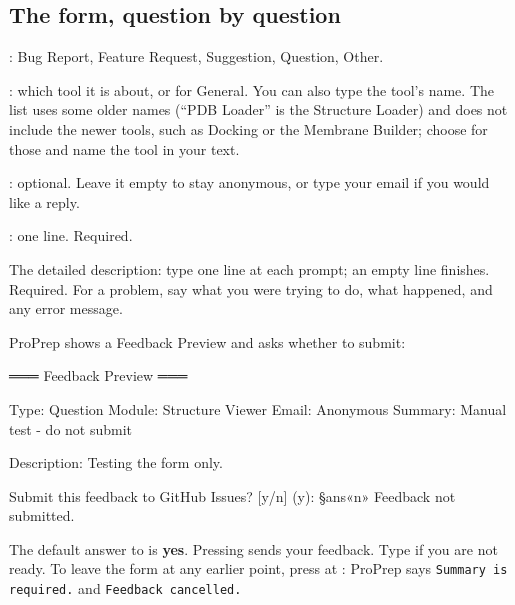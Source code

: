 \subsection*{The form, question by question}

\begin{steps}
  \item {}:  Bug Report,  Feature
  Request,  Suggestion,  Question,  Other.
  \item {}: which tool it is
  about, or  for General. You can also type the tool's name. The list
  uses some older names (``PDB Loader'' is the Structure Loader) and does not
  include the newer tools, such as Docking or the Membrane Builder; choose
   for those and name the tool in your text.
  \item {}: optional. Leave it empty to stay anonymous,
  or type your email if you would like a reply.
  \item {}: one line. Required.
  \item The detailed description: type one line at each \prompt{()} prompt;
  an empty line finishes. Required. For a problem, say what you were trying to
  do, what happened, and any error message.
  \item ProPrep shows a \textsf{Feedback Preview} and asks whether to submit:
\begin{screen}
═══ Feedback Preview ═══

  Type:                   Question
  Module:                 Structure Viewer
  Email:                  Anonymous
  Summary:                Manual test - do not submit

  Description:
  Testing the form only.


Submit this feedback to GitHub Issues? [y/n] (y): §ans«n»
Feedback not submitted.
\end{screen}
\end{steps}

\begin{watchout}
The default answer to 
is \textbf{yes}. Pressing  sends your feedback. Type  if you
are not ready. To leave the form at any earlier point, press  at
: ProPrep says \texttt{Summary is required.} and
\texttt{Feedback cancelled.}
\end{watchout}

